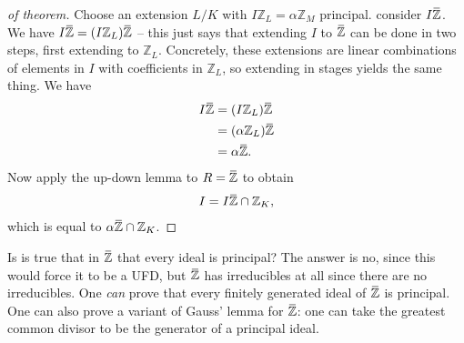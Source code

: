 \begin{proof}[of theorem]

Choose an extension \(L/K\) with
\(I{\mathbb{Z}}_L = \alpha{\mathbb{Z}}_M\) principal. consider
\(I\mkern 1.5mu\overline{\mkern-1.5mu{\mathbb{Z}}\mkern-1.5mu}\mkern 1.5mu\).
We have
\(I\mkern 1.5mu\overline{\mkern-1.5mu{\mathbb{Z}}\mkern-1.5mu}\mkern 1.5mu= (I{\mathbb{Z}}_L)\mkern 1.5mu\overline{\mkern-1.5mu{\mathbb{Z}}\mkern-1.5mu}\mkern 1.5mu\)
-- this just says that extending \(I\) to
\(\mkern 1.5mu\overline{\mkern-1.5mu{\mathbb{Z}}\mkern-1.5mu}\mkern 1.5mu\)
can be done in two steps, first extending to \({\mathbb{Z}}_L\).
Concretely, these extensions are linear combinations of elements in
\(I\) with coefficients in \({\mathbb{Z}}_L\), so extending in stages
yields the same thing. We have
\begin{align*}
I\mkern 1.5mu\overline{\mkern-1.5mu{\mathbb{Z}}\mkern-1.5mu}\mkern 1.5mu
&= (I{\mathbb{Z}}_L) \mkern 1.5mu\overline{\mkern-1.5mu{\mathbb{Z}}\mkern-1.5mu}\mkern 1.5mu\\
&= ( \alpha {\mathbb{Z}}_L) \mkern 1.5mu\overline{\mkern-1.5mu{\mathbb{Z}}\mkern-1.5mu}\mkern 1.5mu\\
&= \alpha\mkern 1.5mu\overline{\mkern-1.5mu{\mathbb{Z}}\mkern-1.5mu}\mkern 1.5mu
.\end{align*}
Now apply the up-down lemma to
\(R = \mkern 1.5mu\overline{\mkern-1.5mu{\mathbb{Z}}\mkern-1.5mu}\mkern 1.5mu\)
to obtain
\begin{align*}
I = I\mkern 1.5mu\overline{\mkern-1.5mu{\mathbb{Z}}\mkern-1.5mu}\mkern 1.5mu\cap{\mathbb{Z}}_K
,\end{align*}
which is equal to
\(\alpha\mkern 1.5mu\overline{\mkern-1.5mu{\mathbb{Z}}\mkern-1.5mu}\mkern 1.5mu\cap{\mathbb{Z}}_K\).

\end{proof}

\begin{remark}

Is is true that in
\(\mkern 1.5mu\overline{\mkern-1.5mu{\mathbb{Z}}\mkern-1.5mu}\mkern 1.5mu\)
that every ideal is principal? The answer is no, since this would force
it to be a UFD, but
\(\mkern 1.5mu\overline{\mkern-1.5mu{\mathbb{Z}}\mkern-1.5mu}\mkern 1.5mu\)
has irreducibles at all since there are no irreducibles. One \emph{can}
prove that every finitely generated ideal of
\(\mkern 1.5mu\overline{\mkern-1.5mu{\mathbb{Z}}\mkern-1.5mu}\mkern 1.5mu\)
is principal. One can also prove a variant of Gauss' lemma for
\(\mkern 1.5mu\overline{\mkern-1.5mu{\mathbb{Z}}\mkern-1.5mu}\mkern 1.5mu\):
one can take the greatest common divisor to be the generator of a
principal ideal.

\end{remark}

